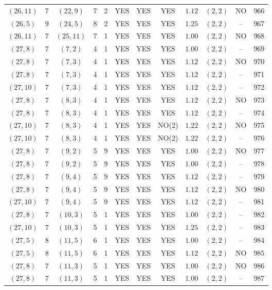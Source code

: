 \begin{longtable}{|c|c|c|c|c|c|c|c|c|c|c|c|}
$(26,11)$ & 7 & $(22,9)$ & 7 & 2 & YES & YES & YES & $1.12$ & $(2,2)$ & NO & 966\\
$(26,5)$ & 9 & $(24,5)$ & 8 & 2 & YES & YES & YES & $1.25$ & $(2,2)$ & -- & 967\\
$(26,11)$ & 7 & $(25,11)$ & 7 & 1 & YES & YES & YES & $1.00$ & $(2,2)$ & NO & 968\\
$(27,8)$ & 7 & $(7,2)$ & 4 & 1 & YES & YES & YES & $1.00$ & $(2,2)$ & -- & 969\\
$(27,8)$ & 7 & $(7,3)$ & 4 & 1 & YES & YES & YES & $1.12$ & $(2,2)$ & NO & 970\\
$(27,8)$ & 7 & $(7,3)$ & 4 & 1 & YES & YES & YES & $1.12$ & $(2,2)$ & -- & 971\\
$(27,10)$ & 7 & $(7,3)$ & 4 & 1 & YES & YES & YES & $1.12$ & $(2,2)$ & -- & 972\\
$(27,8)$ & 7 & $(8,3)$ & 4 & 1 & YES & YES & YES & $1.12$ & $(2,2)$ & NO & 973\\
$(27,8)$ & 7 & $(8,3)$ & 4 & 1 & YES & YES & YES & $1.12$ & $(2,2)$ & -- & 974\\
$(27,10)$ & 7 & $(8,3)$ & 4 & 1 & YES & YES & NO(2) & $1.22$ & $(2,2)$ & NO & 975\\
$(27,10)$ & 7 & $(8,3)$ & 4 & 1 & YES & YES & NO(2) & $1.22$ & $(2,2)$ & -- & 976\\
$(27,8)$ & 7 & $(9,2)$ & 5 & 9 & YES & YES & YES & $1.00$ & $(2,2)$ & NO & 977\\
$(27,8)$ & 7 & $(9,2)$ & 5 & 9 & YES & YES & YES & $1.00$ & $(2,2)$ & -- & 978\\
$(27,8)$ & 7 & $(9,4)$ & 5 & 9 & YES & YES & YES & $1.12$ & $(2,2)$ & -- & 979\\
$(27,8)$ & 7 & $(9,4)$ & 5 & 9 & YES & YES & YES & $1.12$ & $(2,2)$ & NO & 980\\
$(27,10)$ & 7 & $(9,4)$ & 5 & 9 & YES & YES & YES & $1.12$ & $(2,2)$ & -- & 981\\
$(27,8)$ & 7 & $(10,3)$ & 5 & 1 & YES & YES & YES & $1.00$ & $(2,2)$ & -- & 982\\
$(27,10)$ & 7 & $(10,3)$ & 5 & 1 & YES & YES & YES & $1.25$ & $(2,2)$ & -- & 983\\
$(27,5)$ & 8 & $(11,5)$ & 6 & 1 & YES & YES & YES & $1.00$ & $(2,2)$ & -- & 984\\
$(27,5)$ & 8 & $(11,5)$ & 6 & 1 & YES & YES & YES & $1.12$ & $(2,2)$ & NO & 985\\
$(27,8)$ & 7 & $(11,3)$ & 5 & 1 & YES & YES & YES & $1.00$ & $(2,2)$ & NO & 986\\
$(27,8)$ & 7 & $(11,3)$ & 5 & 1 & YES & YES & YES & $1.00$ & $(2,2)$ & -- & 987\\

\end{longtable}
